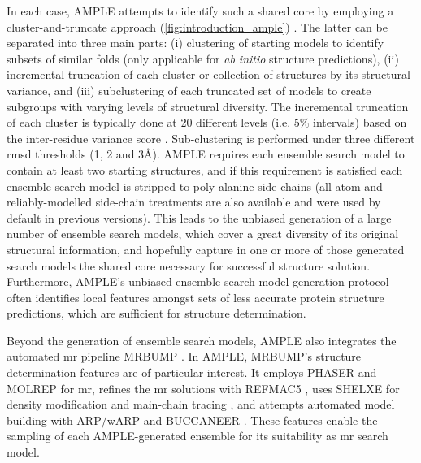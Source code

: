 In each case, AMPLE attempts to identify such a shared core by employing a cluster-and-truncate approach (\cref{fig:introduction_ample}) \cite{Bibby2012-lm}. The latter can be separated into three main parts: (i) clustering of starting models to identify subsets of similar folds (only applicable for \textit{ab initio} structure predictions), (ii) incremental truncation of each cluster or collection of structures by its structural variance, and (iii) subclustering of each truncated set of models to create subgroups with varying levels of structural diversity. The incremental truncation of each cluster is typically done at 20 different levels (i.e. 5\% intervals) based on the inter-residue variance score \cite{Theobald2006-qj}. Sub-clustering is performed under three different \gls{rmsd} thresholds (1, 2 and 3\AA). AMPLE requires each ensemble search model to contain at least two starting structures, and if this requirement is satisfied each ensemble search model is stripped to poly-alanine side-chains (all-atom and reliably-modelled side-chain \cite{Krivov2009-ex} treatments are also available and were used by default in previous versions). This leads to the unbiased generation of a large number of ensemble search models, which cover a great diversity of its original structural information, and hopefully capture in one or more of those generated search models the shared core necessary for successful structure solution. Furthermore, AMPLE's unbiased ensemble search model generation protocol often identifies local features amongst sets of less accurate  protein structure predictions, which are sufficient for structure determination. 

Beyond the generation of ensemble search models, AMPLE also integrates the automated \gls{mr} pipeline MRBUMP \cite{Keegan2018-kn}. In AMPLE, MRBUMP's structure determination features are of particular interest. It employs PHASER \cite{McCoy2007-mp} and MOLREP \cite{Vagin2010-ux} for \gls{mr}, refines the \gls{mr} solutions with REFMAC5 \cite{Murshudov2011-ww}, uses SHELXE for density modification and main-chain tracing \cite{Thorn2013-le}, and attempts automated model building with ARP/wARP \cite{Cohen2007-wg} and BUCCANEER \cite{Cowtan2006-xv}. These features enable the sampling of each AMPLE-generated ensemble for its suitability as \gls{mr} search model.

% 
%

